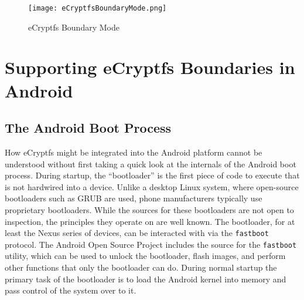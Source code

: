 \begin{figure}[htb] 
\begin{center}
\texttt{[image: eCryptfsBoundaryMode.png]}\end{center}
\caption{eCryptfs Boundary Mode} \label{fig:ecryptfsboundary} \end{figure}

\section{Supporting eCryptfs Boundaries in Android}

\subsection{The Android Boot Process} How eCryptfs might be integrated into the Android platform cannot be understood without first
taking a quick look at the internals of the Android boot process. During startup, the ``bootloader'' is the first piece of code to
execute that is not hardwired into a device. Unlike a desktop Linux system, where open-source bootloaders such as GRUB are used,
phone manufacturers typically use proprietary bootloaders. While the sources for these bootloaders are not open to inspection, the
principles they operate on are well known. The bootloader, for at least the Nexus series of devices, can be interacted with via the
\texttt{fastboot} protocol. The Android Open Source Project includes the source for the \texttt{fastboot} utility, which can be used
to unlock the bootloader, flash images, and perform other functions that only the bootloader can do.  During normal startup the
primary task of the bootloader is to load the Android kernel into memory and pass control of the system over to it. 

